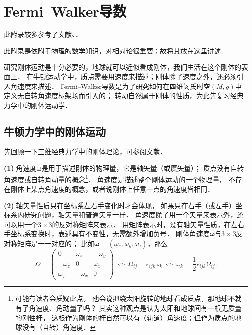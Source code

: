 

\chapter{Fermi--Walker导数}\label{chFW}

此附录较多参考了文献\parencite[\S 4.1]{hawking-ellis1973}、\parencite[\S 6.5]{mtw1973}．

此附录是依附于物理的数学知识，对相对论很重要；故将其放在这里讲述．


研究刚体运动是十分必要的，地球就可以近似看成刚体，我们生活在这个刚体的表面上．
在牛顿运动学中，质点需要用速度来描述；刚体除了速度之外，还必须引入角速度来描述．
Fermi--Walker导数是为了研究如何在四维闵氏时空$(M,g)$中定义无自转角速度标架场而引入的；
转动自然属于刚体的性质，为此先复习经典力学中的刚体运动学．

\section{牛顿力学中的刚体运动}
先回顾一下三维经典力学中的刚体理论，可参阅文献\parencite[Ch. 3]{zhuzx-zy-vI}．

{\bfseries (1)} 角速度$\boldsymbol{\omega}$是用于描述刚体的物理量，它是轴矢量（或赝矢量）；
质点没有自转角速度或自转角动量的概念{\footnote{可能有读者会质疑此点，
		他会说把绕太阳旋转的地球看成质点，那地球不就有了角速度、角动量了吗？
		其实这种观点是认为太阳和地球间有一根无质量的刚性杆，
		这根作为刚体的杆自然可以有（轨道）角速度；但作为质点的地球没有（自转）角速度．}}．
角速度是描述整个刚体运动的一个物理量，
不存在刚体上某点角速度的概念，或者说刚体上任意一点的角速度皆相同．

{\bfseries (2)} 轴矢量性质只在坐标系左右手变化时才会体现，
如果只在右手（或左手）坐标系内研究问题，轴矢量和普通矢量一样．
角速度除了用一个矢量来表示外，还可以用一个$3\times 3$的反对称矩阵来表示．
用矩阵表示时，没有轴矢量性质，在左右手坐标系变换时，表述具有不变性，无需额外增加负号．
刚体角速度$\boldsymbol{\omega}$与$3\times 3$反对称矩阵是一一对应的；
比如$\boldsymbol{\omega}=(\omega_x,\omega_y,\omega_z)$，那么
\begin{equation}\label{chFW:eqn_jsd}
	\Omega=\begin{pmatrix}
		0 &  \omega_z & -\omega_y \\
		-\omega_z& 0 & \omega_x \\
		\omega_y & -\omega_x & 0
	\end{pmatrix}
	\ \Longleftrightarrow \
	\Omega_{ij}= \epsilon_{ijk} \omega_k
	\ \Longleftrightarrow \
	\omega_k = \frac{1}{2}\epsilon_{ijk} \Omega_{ij} .
\end{equation}


